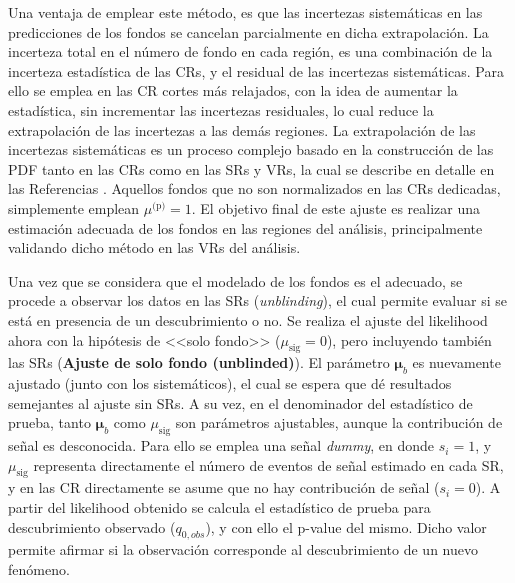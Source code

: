Una ventaja de emplear este método, es que las incertezas sistemáticas en las predicciones de los fondos se cancelan parcialmente en dicha extrapolación. La incerteza total en el número de fondo en cada región, es una combinación de la incerteza estadística de las CRs, y el residual de las incertezas sistemáticas. Para ello se emplea en las CR cortes más relajados, con la idea de aumentar la estadística, sin incrementar las incertezas residuales, lo cual reduce la extrapolación de las incertezas a las demás regiones. La extrapolación de las incertezas sistemáticas es un proceso complejo basado en la construcción de las PDF tanto en las CRs como en las SRs y VRs, la cual se describe en detalle en las Referencias \cite{Baak:2014wma, Cranmer:1456844}. Aquellos fondos que no son normalizados en las CRs dedicadas, simplemente emplean $\mu^{\text{(p)}}=1$. El objetivo final de este ajuste es realizar una estimación adecuada de los fondos en las regiones del análisis, principalmente validando dicho método en las VRs del análisis.

Una vez que se considera que el modelado de los fondos es el adecuado, se procede a observar los datos en las SRs (\textit{unblinding}), el cual permite evaluar si se está en presencia de un descubrimiento o no. Se realiza el ajuste del likelihood ahora con la hipótesis de <<solo fondo>> ($\mu_\text{sig}=0$), pero incluyendo también las SRs (\textbf{Ajuste de solo fondo (unblinded)}). El parámetro $\bm{\mu}_b$ es nuevamente ajustado (junto con los sistemáticos), el cual se espera que dé resultados semejantes al ajuste sin SRs. A su vez, en el denominador del estadístico de prueba, tanto $\bm{\mu}_b$ como $\mu_\text{sig}$ son parámetros ajustables, aunque la contribución de señal es desconocida. Para ello se emplea una señal \textit{dummy}, en donde $s_i=1$, y $\mu_\text{sig}$ representa directamente el número de eventos de señal estimado en cada SR, y en las CR directamente se asume que no hay contribución de señal ($s_i=0$). 
A partir del likelihood obtenido se calcula el estadístico de prueba para descubrimiento observado ($q_{0, obs}$), y con ello el p-value del mismo. Dicho valor permite  afirmar si la observación corresponde al descubrimiento de un nuevo fenómeno.


